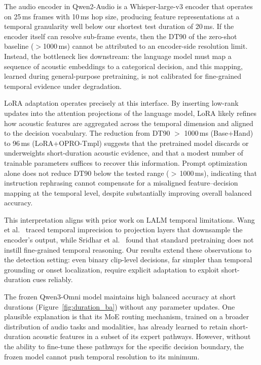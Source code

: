 \documentclass[11pt,a4paper]{article}
\begin{document}
The audio encoder in Qwen2-Audio is a Whisper-large-v3 encoder that operates on 25\,ms frames with 10\,ms hop size, producing feature representations at a temporal granularity well below our shortest test duration of 20\,ms. If the encoder itself can resolve sub-frame events, then the DT90 of the zero-shot baseline ($>$1000\,ms) cannot be attributed to an encoder-side resolution limit. Instead, the bottleneck lies downstream: the language model must map a sequence of acoustic embeddings to a categorical decision, and this mapping, learned during general-purpose pretraining, is not calibrated for fine-grained temporal evidence under degradation.

LoRA adaptation operates precisely at this interface. By inserting low-rank updates into the attention projections of the language model, LoRA likely refines how acoustic features are aggregated across the temporal dimension and aligned to the decision vocabulary. The reduction from DT90 $>$ 1000\,ms (Base+Hand) to 96\,ms (LoRA+OPRO-Tmpl) suggests that the pretrained model discards or underweights short-duration acoustic evidence, and that a modest number of trainable parameters suffices to recover this information. Prompt optimization alone does not reduce DT90 below the tested range ($>$\,1000\,ms), indicating that instruction rephrasing cannot compensate for a misaligned feature--decision mapping at the temporal level, despite substantially improving overall balanced accuracy.

This interpretation aligns with prior work on LALM temporal limitations. Wang et al.~\cite{wang2025timeaudio} traced temporal imprecision to projection layers that downsample the encoder's output, while Sridhar et al.~\cite{sridhar-etal-2025-enhancing} found that standard pretraining does not instill fine-grained temporal reasoning. Our results extend these observations to the detection setting: even binary clip-level decisions, far simpler than temporal grounding or onset localization, require explicit adaptation to exploit short-duration cues reliably.

The frozen Qwen3-Omni model maintains high balanced accuracy at short durations (Figure~\ref{fig:duration_ba}) without any parameter updates. One plausible explanation is that its MoE routing mechanism, trained on a broader distribution of audio tasks and modalities, has already learned to retain short-duration acoustic features in a subset of its expert pathways. However, without the ability to fine-tune these pathways for the specific decision boundary, the frozen model cannot push temporal resolution to its minimum.
\end{document}
